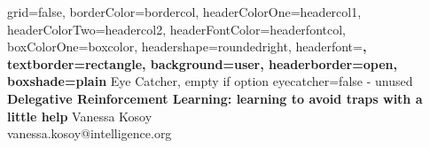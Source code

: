 \documentclass[a0paper,portrait]{baposter}
\begin{document}


\begin{poster}{
        grid=false,
        borderColor=bordercol,
        headerColorOne=headercol1,
        headerColorTwo=headercol2,
        headerFontColor=headerfontcol,
        boxColorOne=boxcolor,
        headershape=roundedright,
        headerfont=\Large\sf\bf,
        textborder=rectangle,
        background=user,
        headerborder=open,
  boxshade=plain
}
{
        Eye Catcher, empty if option eyecatcher=false - unused
}
{\sf\bf
        Delegative Reinforcement Learning: learning to avoid traps with a little help
}
{
        \vspace{1em} Vanessa Kosoy\\
        {\smaller vanessa.kosoy@intelligence.org}
}
{
}


\end{poster}
\end{document}
